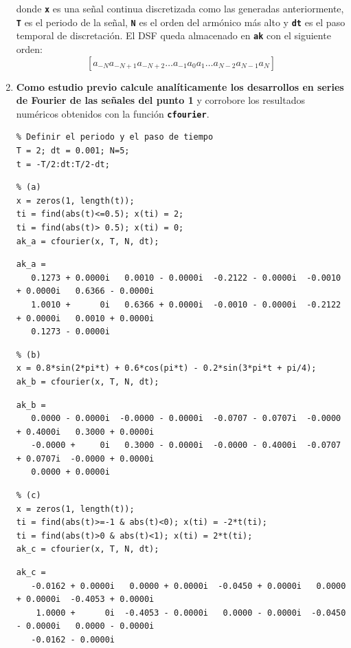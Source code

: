 \documentclass{article}
\newcommand{\code}[1]{\texttt{\textbf{#1}}}
\begin{document}
\begin{enumerate}[leftmargin=*]
donde \code{x} es una señal continua discretizada como las generadas anteriormente, \code{T} es el periodo de la señal, \code{N} es el orden del armónico más alto y \code{dt} es el paso temporal de discretación. El DSF queda almacenado en \code{ak} con el siguiente orden: \[ \left[a_{-N}a_{-N+1}a_{-N+2}\dots a_{-1}a_0a_1\dots a_{N-2}a_{N-1}a_{N}\right] \]
\item \textbf{Como estudio previo calcule analíticamente los desarrollos en series de Fourier de las señales del punto 1} y corrobore los resultados numéricos obtenidos con la función \code{cfourier}.

\begin{lstlisting}
% Definir el periodo y el paso de tiempo
T = 2; dt = 0.001; N=5;
t = -T/2:dt:T/2-dt;
\end{lstlisting}

\begin{lstlisting}
% (a)
x = zeros(1, length(t));
ti = find(abs(t)<=0.5); x(ti) = 2;
ti = find(abs(t)> 0.5); x(ti) = 0;
ak_a = cfourier(x, T, N, dt);
\end{lstlisting}
\begin{verbatim}
ak_a = 
   0.1273 + 0.0000i   0.0010 - 0.0000i  -0.2122 - 0.0000i  -0.0010 + 0.0000i   0.6366 - 0.0000i
   1.0010 +      0i   0.6366 + 0.0000i  -0.0010 - 0.0000i  -0.2122 + 0.0000i   0.0010 + 0.0000i
   0.1273 - 0.0000i
\end{verbatim}
\begin{lstlisting}
% (b)
x = 0.8*sin(2*pi*t) + 0.6*cos(pi*t) - 0.2*sin(3*pi*t + pi/4);
ak_b = cfourier(x, T, N, dt);
\end{lstlisting}

\begin{verbatim}
ak_b =
   0.0000 - 0.0000i  -0.0000 - 0.0000i  -0.0707 - 0.0707i  -0.0000 + 0.4000i   0.3000 + 0.0000i  
   -0.0000 +     0i   0.3000 - 0.0000i  -0.0000 - 0.4000i  -0.0707 + 0.0707i  -0.0000 + 0.0000i
   0.0000 + 0.0000i
\end{verbatim}

\begin{lstlisting}
% (c)
x = zeros(1, length(t));
ti = find(abs(t)>=-1 & abs(t)<0); x(ti) = -2*t(ti);
ti = find(abs(t)>0 & abs(t)<1); x(ti) = 2*t(ti);
ak_c = cfourier(x, T, N, dt);
\end{lstlisting}

\begin{verbatim}
ak_c =
   -0.0162 + 0.0000i   0.0000 + 0.0000i  -0.0450 + 0.0000i   0.0000 + 0.0000i  -0.4053 + 0.0000i
    1.0000 +      0i  -0.4053 - 0.0000i   0.0000 - 0.0000i  -0.0450 - 0.0000i   0.0000 - 0.0000i  
   -0.0162 - 0.0000i
\end{verbatim}


\end{enumerate}
\end{document}
